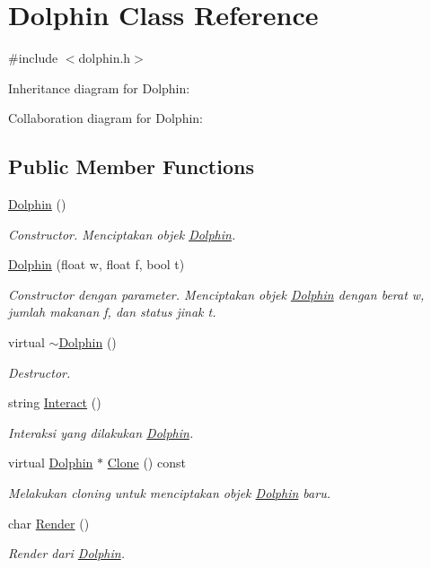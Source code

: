 \hypertarget{classDolphin}{}\section{Dolphin Class Reference}
\label{classDolphin}


{\ttfamily \#include $<$dolphin.\+h$>$}



Inheritance diagram for Dolphin\+:


Collaboration diagram for Dolphin\+:
\subsection*{Public Member Functions}
\begin{DoxyCompactItemize}
\item 
\hyperlink{classDolphin_a571a22b2c3cece5c8175ff49640b35bc}{Dolphin} ()
\begin{DoxyCompactList}\small\item\em Constructor. Menciptakan objek \hyperlink{classDolphin}{Dolphin}. \end{DoxyCompactList}\item 
\hyperlink{classDolphin_a024370cf7beeaef3fbdcdd5fef09e6ef}{Dolphin} (float w, float f, bool t)
\begin{DoxyCompactList}\small\item\em Constructor dengan parameter. Menciptakan objek \hyperlink{classDolphin}{Dolphin} dengan berat w, jumlah makanan f, dan status jinak t. \end{DoxyCompactList}\item 
virtual \hyperlink{classDolphin_a5c11950fe5675f3c36001f20a12343af}{$\sim$\+Dolphin} ()
\begin{DoxyCompactList}\small\item\em Destructor. \end{DoxyCompactList}\item 
string \hyperlink{classDolphin_a592506c38c185d7d383ae755deb9bd72}{Interact} ()
\begin{DoxyCompactList}\small\item\em Interaksi yang dilakukan \hyperlink{classDolphin}{Dolphin}. \end{DoxyCompactList}\item 
virtual \hyperlink{classDolphin}{Dolphin} $\ast$ \hyperlink{classDolphin_a4be3892432206693d2fae815303e07c4}{Clone} () const 
\begin{DoxyCompactList}\small\item\em Melakukan cloning untuk menciptakan objek \hyperlink{classDolphin}{Dolphin} baru. \end{DoxyCompactList}\item 
char \hyperlink{classDolphin_aa051d8ebe93c1c11b503ae76d07cd178}{Render} ()
\begin{DoxyCompactList}\small\item\em Render dari \hyperlink{classDolphin}{Dolphin}. \end{DoxyCompactList}\end{DoxyCompactItemize}
